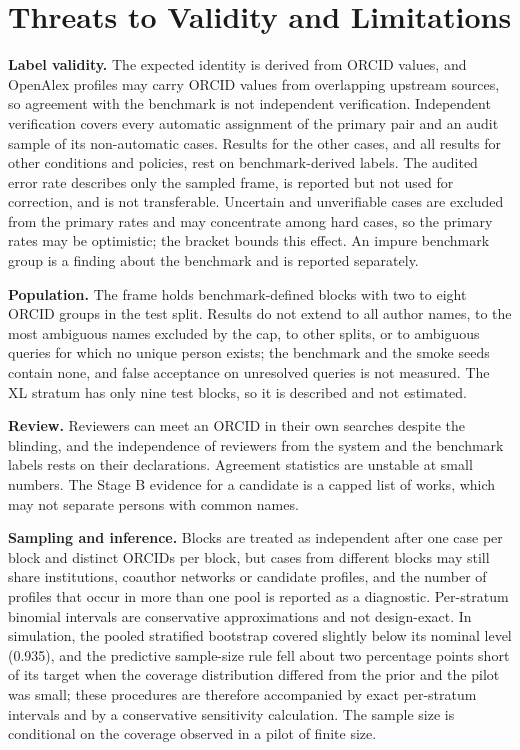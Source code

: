 \section{Threats to Validity and Limitations}
\label{sec:threats}
\textbf{Label validity.} The expected identity is derived from ORCID values, and OpenAlex profiles may carry ORCID values from overlapping upstream sources, so agreement with the benchmark is not independent verification. Independent verification covers every automatic assignment of the primary pair and an audit sample of its non-automatic cases. Results for the other cases, and all results for other conditions and policies, rest on benchmark-derived labels. The audited error rate describes only the sampled frame, is reported but not used for correction, and is not transferable. Uncertain and unverifiable cases are excluded from the primary rates and may concentrate among hard cases, so the primary rates may be optimistic; the bracket bounds this effect. An impure benchmark group is a finding about the benchmark and is reported separately.

\textbf{Population.} The frame holds benchmark-defined blocks with two to eight ORCID groups in the test split. Results do not extend to all author names, to the most ambiguous names excluded by the cap, to other splits, or to ambiguous queries for which no unique person exists; the benchmark and the smoke seeds contain none, and false acceptance on unresolved queries is not measured. The XL stratum has only nine test blocks, so it is described and not estimated.

\textbf{Review.} Reviewers can meet an ORCID in their own searches despite the blinding, and the independence of reviewers from the system and the benchmark labels rests on their declarations. Agreement statistics are unstable at small numbers. The Stage B evidence for a candidate is a capped list of works, which may not separate persons with common names.

\textbf{Sampling and inference.} Blocks are treated as independent after one case per block and distinct ORCIDs per block, but cases from different blocks may still share institutions, coauthor networks or candidate profiles, and the number of profiles that occur in more than one pool is reported as a diagnostic. Per-stratum binomial intervals are conservative approximations and not design-exact. In simulation, the pooled stratified bootstrap covered slightly below its nominal level (0.935), and the predictive sample-size rule fell about two percentage points short of its target when the coverage distribution differed from the prior and the pilot was small; these procedures are therefore accompanied by exact per-stratum intervals and by a conservative sensitivity calculation. The sample size is conditional on the coverage observed in a pilot of finite size.

